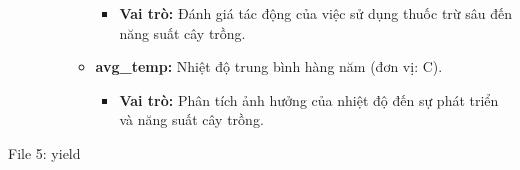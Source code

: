 \begin{description}
\begin{itemize}
\begin{itemize}
            \begin{itemize}
                \item \textbf{Vai trò:} Đánh giá tác động của việc sử dụng thuốc trừ sâu đến năng suất cây trồng.
            \end{itemize}
            \item \textbf{avg\_temp:} Nhiệt độ trung bình hàng năm (đơn vị: \textdegree C).
            \begin{itemize}
                \item \textbf{Vai trò:} Phân tích ảnh hưởng của nhiệt độ đến sự phát triển và năng suất cây trồng.
            \end{itemize}
        \end{itemize}
    \end{itemize}

    \item[File 5: yield]


\end{description}
